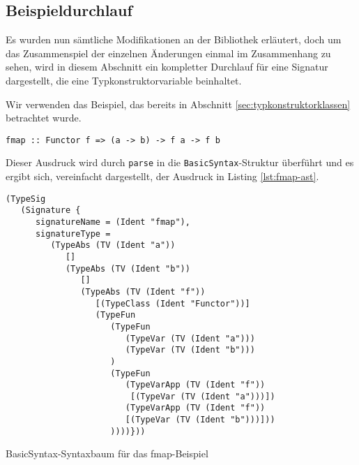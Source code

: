 


\subsection{Beispieldurchlauf}

Es wurden nun sämtliche Modifikationen an der Bibliothek erläutert, doch um das Zusammenspiel der einzelnen Änderungen
einmal im Zusammenhang zu sehen, wird in diesem Abschnitt ein kompletter Durchlauf für eine Signatur dargestellt, die eine
Typkonstruktorvariable beinhaltet.


Wir verwenden das Beispiel, das bereits in Abschnitt \ref{sec:typkonstruktorklassen} betrachtet wurde.

\begin{verbatim}
fmap :: Functor f => (a -> b) -> f a -> f b
\end{verbatim}

Dieser Ausdruck wird durch \texttt{parse} in die \texttt{BasicSyntax}-Struktur überführt und es ergibt sich, vereinfacht dargestellt,
der Ausdruck in Listing \ref{lst:fmap-ast}.

\begin{listing}[ht]
\begin{verbatim}
(TypeSig
   (Signature {
      signatureName = (Ident "fmap"),
      signatureType =
         (TypeAbs (TV (Ident "a"))
            []
            (TypeAbs (TV (Ident "b"))
               []
               (TypeAbs (TV (Ident "f"))
                  [(TypeClass (Ident "Functor"))]
                  (TypeFun
                     (TypeFun
                        (TypeVar (TV (Ident "a")))
                        (TypeVar (TV (Ident "b")))
                     )
                     (TypeFun
                        (TypeVarApp (TV (Ident "f"))
                         [(TypeVar (TV (Ident "a")))])
                        (TypeVarApp (TV (Ident "f"))
                        [(TypeVar (TV (Ident "b")))]))
                     ))))}))
\end{verbatim}
\caption{BasicSyntax-Syntaxbaum für das fmap-Beispiel}
\label{lst:fmap-ast}
\end{listing}

